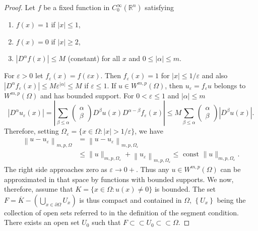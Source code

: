 \begin{proof}
  Let $f$ be a fixed function in $C_0^{\infty}\left(\mathbb{R}^n\right)$ satisfying
  \begin{enumerate}[label = (\roman*)]
    \item $f(x)=1$ if $|x| \leq 1$,
    \item $f(x)=0$ if $|x| \geq 2$,
    \item $\left|D^\alpha f(x)\right| \leq M$ (constant) for all $x$ and $0 \leq|\alpha| \leq m$.
  \end{enumerate}
  For $\varepsilon>0$ let $f_\varepsilon(x)=f(\varepsilon x)$.
  Then $f_\varepsilon(x)=1$ for $|x| \leq 1 / \varepsilon$
  and also $\left|D^\alpha f_\varepsilon(x)\right| \leq M \varepsilon^{|\alpha|} \leq M$
  if $\varepsilon \leq 1$. If $u \in W^{m,p}(\Omega)$, then $u_\varepsilon=f_\varepsilon u$
  belongs to $W^{m,p}(\Omega)$ and has bounded support.
  For $0<\varepsilon \leq 1$ and $|\alpha| \leq m$
  \[
  \left|D^\alpha u_\varepsilon(x)\right|=\left|\sum_{\beta \leq \alpha}\left(\begin{array}{c}
  \alpha \\
  \beta
  \end{array}\right) D^\beta u(x) D^{\alpha-\beta} f_\varepsilon(x)\right| \leq M \sum_{\beta \leq \alpha}\left(\begin{array}{c}
  \alpha \\
  \beta
  \end{array}\right)\left|D^\beta u(x)\right| .
  \]
  Therefore, setting $\Omega_\varepsilon=\{x \in \Omega:|x|>1 / \varepsilon\}$, we have
  \[
  \begin{aligned}
  \left\|u-u_\varepsilon\right\|_{m, p, \Omega} & =\left\|u-u_\varepsilon\right\|_{m, p, \Omega_\varepsilon} \\
  & \leq\|u\|_{m, p, \Omega_\varepsilon}+\left\|u_\varepsilon\right\|_{m, p, \Omega_\varepsilon} \leq \text { const }\|u\|_{m, p, \Omega_\varepsilon} .
  \end{aligned}
  \]
  The right side approaches zero as $\varepsilon \rightarrow 0+$.
  Thus any $u \in W^{m,p}(\Omega)$ can be approximated in that space by functions
  with bounded supports.
  We now, therefore, assume that $K=\{x \in \Omega: u(x) \neq 0\}$ is bounded.
  The set $F=\overline{K}-\left(\bigcup_{x \in\partial\Omega} U_x\right)$
  is thus compact and contained in $\Omega$, $\left\{U_x\right\}$
  being the collection of open sets 
  referred to in the definition of the segment condition.
  There exists an open set $U_0$ such that $F \subset\subset U_0 \subset\subset \Omega$.

\end{proof}
